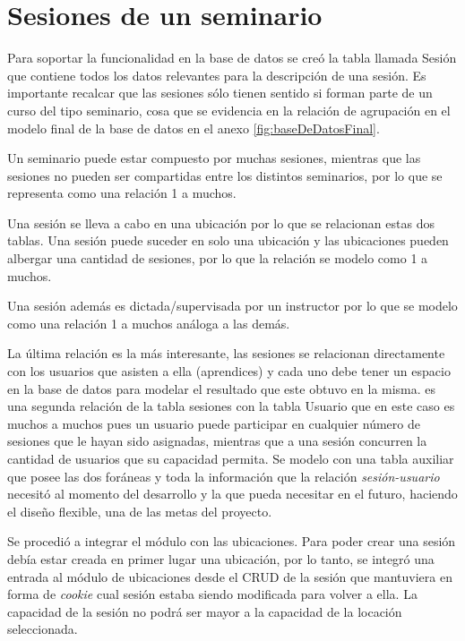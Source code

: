 
	\section{Sesiones de un seminario} %
	\label{sec:sesiones_de_un_seminario}
	
	Para soportar la funcionalidad en la base de datos se creó la tabla llamada Sesión que contiene todos los datos relevantes para la descripción de una sesión. Es importante recalcar que las sesiones sólo tienen sentido si forman parte de un curso del tipo seminario, cosa que se evidencia en la relación de agrupación en el modelo final de la base de datos en el anexo \ref{fig:baseDeDatosFinal}. 

	Un seminario puede estar compuesto por muchas sesiones, mientras que las sesiones no pueden ser compartidas entre los distintos seminarios, por lo que se representa como una relación 1 a muchos. 

	Una sesión se lleva a cabo en una ubicación por lo que se relacionan estas dos tablas. Una sesión puede suceder en solo una ubicación y las ubicaciones pueden albergar una cantidad de sesiones, por lo que la relación se modelo como 1 a muchos.

	Una sesión además es dictada/supervisada por un instructor por lo que se modelo como una relación 1 a muchos análoga a las demás.

	La última relación es la más interesante, las sesiones se relacionan directamente con los usuarios que asisten a ella (aprendices) y cada uno debe tener un espacio en la base de datos para modelar el resultado que este obtuvo en la misma. es una segunda relación de la tabla sesiones con la tabla Usuario que en este caso es muchos a muchos pues un usuario puede participar en cualquier número de sesiones que le hayan sido asignadas, mientras que a una sesión concurren la cantidad de usuarios que su capacidad permita. Se modelo con una tabla auxiliar que posee las dos foráneas y toda la información que la relación \emph{sesión-usuario} necesitó al momento del desarrollo y la que pueda necesitar en el futuro, haciendo el diseño flexible, una de las metas del proyecto.

	Se procedió a integrar el módulo con las ubicaciones. Para poder crear una sesión debía estar creada en primer lugar una ubicación, por lo tanto, se integró una entrada al módulo de ubicaciones desde el CRUD de la sesión que mantuviera en forma de \emph{cookie} cual sesión estaba siendo modificada para volver a ella. La capacidad de la sesión no podrá ser mayor a la capacidad de la locación seleccionada.

